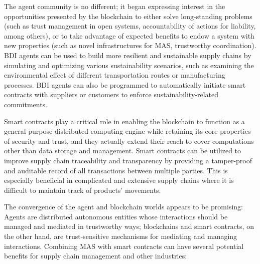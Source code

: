 \vspace{.5cm}

The agent community is no different; it began expressing interest in the opportunities presented by the blockchain to either solve long-standing problems (such as trust management in open systems, accountability of actions for liability, among others), or to take advantage of expected benefits to endow a system with new properties (such as novel infrastructures for \ac{MAS}, trustworthy coordination). \ac{BDI} agents can be used to build more resilient and sustainable supply chains by simulating and optimizing various sustainability scenarios, such as examining the environmental effect of different transportation routes or manufacturing processes. \ac{BDI} agents can also be programmed to automatically initiate smart contracts with suppliers or customers to enforce sustainability-related commitments.

\vspace{.5cm}

Smart contracts play a critical role in enabling the blockchain to function as a general-purpose distributed computing engine while retaining its core properties of security and trust, and they actually extend their reach to cover computations other than data storage and management. Smart contracts can be utilized to improve supply chain traceability and transparency by providing a tamper-proof and auditable record of all transactions between multiple parties. This is especially beneficial in complicated and extensive supply chains where it is difficult to maintain track of products' movements.

\vspace{.5cm}
The convergence of the agent and blockchain worlds appears to be promising: Agents are distributed autonomous entities whose interactions should be managed and mediated in trustworthy ways; blockchains and smart contracts, on the other hand, are trust-sensitive mechanisms for mediating and managing interactions. Combining \ac{MAS} with smart contracts can have several potential benefits for supply chain management and other industries:

